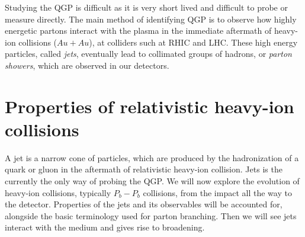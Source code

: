 \documentclass[main.tex]{subfiles}
\begin{document}
Studying the QGP is difficult as it is very short lived and difficult to probe or measure directly. The main method of identifying QGP is to observe how highly energetic partons interact with the plasma in the immediate aftermath of heavy-ion collisions (\(Au+Au\)), at colliders such at RHIC and LHC. These high energy particles, called \emph{jets}, eventually lead to collimated groups of hadrons, or \emph{parton showers}, which are observed in our detectors.

\section{Properties of relativistic heavy-ion collisions}
A jet is a narrow cone of particles, which are produced by the hadronization of a quark or gluon in the aftermath of relativistic heavy-ion collision. Jets is the currently the only way of probing the QGP. We will now explore the evolution of heavy-ion collisions, typically \(P_b-P_b\) collisions,  from the impact all the way to the detector. Properties of the jets and its observables will be accounted for, alongside the basic terminology used for parton branching. Then we will see jets interact with the medium and gives rise to broadening.
\end{document}
